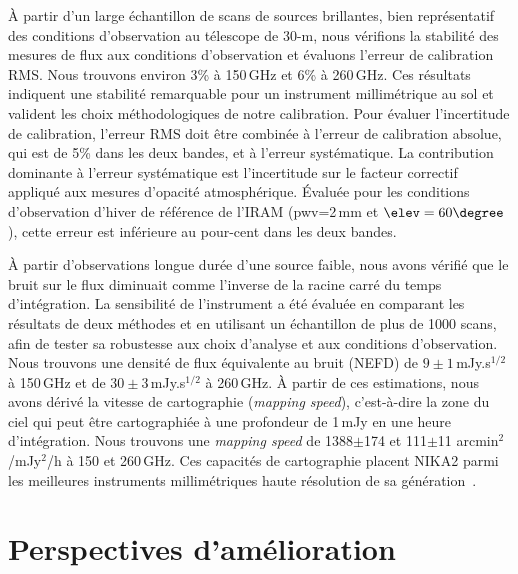 \`A partir d'un large échantillon de scans de sources
brillantes, bien représentatif des conditions d'observation au
télescope de 30-m, nous vérifions la stabilité des mesures de flux aux
conditions d'observation et évaluons l'erreur de calibration RMS. Nous
trouvons environ 3\% à 150\,GHz et 6\% à 260\,GHz. Ces résultats
indiquent une stabilité remarquable pour un instrument millimétrique
au sol et valident les choix méthodologiques de notre
calibration. Pour évaluer l'incertitude de calibration, l'erreur RMS
doit être combinée à l'erreur de calibration absolue, qui est de 5\%
dans les deux bandes, et à l'erreur systématique. La contribution
dominante à l'erreur systématique est l'incertitude sur le facteur
correctif appliqué aux mesures d'opacité atmosphérique. \'Evaluée pour
les conditions d'observation d'hiver de référence de l'IRAM (pwv=2\,mm
et $\elev = 60\degree$), cette erreur est inférieure au pour-cent dans
les deux bandes.

\`A partir d'observations longue durée d'une source faible, nous avons
vérifié que le bruit sur le flux diminuait comme l'inverse de la
racine carré du temps d'intégration. La sensibilité de l'instrument a
été évaluée en comparant les résultats de deux méthodes et en
utilisant un échantillon de plus de 1000 scans, afin de
tester sa robustesse aux choix d'analyse et aux conditions
d'observation.
Nous trouvons une densité de flux équivalente au bruit (NEFD) de
$9\pm1$\,mJy.s$^{1/2}$ à 150\,GHz et de $30\pm3$\,mJy.s$^{1/2}$ à
260\,GHz. \`A partir de ces estimations, nous avons dérivé la vitesse
de cartographie (\emph{mapping speed}), c'est-à-dire la zone du ciel
qui peut être cartographiée à une profondeur de 1\,mJy en une heure
d'intégration. Nous trouvons une \emph{mapping speed} de 1388$\pm$174
et 111$\pm$11 arcmin$^2$/mJy$^2$/h à 150 et 260\,GHz. Ces capacités de
cartographie placent NIKA2 parmi les meilleures instruments
millimétriques haute résolution de sa génération~\citep{Tony2019}.



\section{Perspectives d'amélioration}

